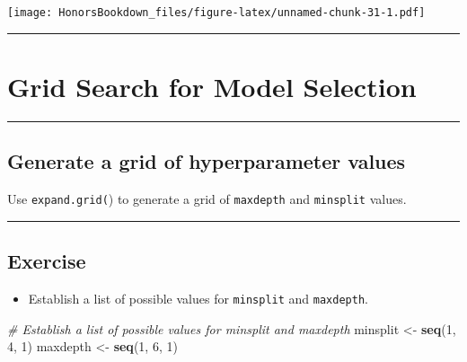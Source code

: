 \documentclass[
]{book}
\newenvironment{Shaded}{\begin{snugshade}}{\end{snugshade}}
\newcommand{\CommentTok}[1]{\textcolor[rgb]{0.56,0.35,0.01}{\textit{#1}}}
\newcommand{\DecValTok}[1]{\textcolor[rgb]{0.00,0.00,0.81}{#1}}
\newcommand{\KeywordTok}[1]{\textcolor[rgb]{0.13,0.29,0.53}{\textbf{#1}}}
\newcommand{\NormalTok}[1]{#1}
\newcommand{\StringTok}[1]{\textcolor[rgb]{0.31,0.60,0.02}{#1}}
\providecommand{\tightlist}{%
  \setlength{\itemsep}{0pt}\setlength{\parskip}{0pt}}
\begin{document}
\texttt{[image: HonorsBookdown\_files/figure-latex/unnamed-chunk-31-1.pdf]}

\begin{center}\rule{0.5\linewidth}{0.5pt}\end{center}

\hypertarget{grid-search-for-model-selection}{%
\section{Grid Search for Model Selection}\label{grid-search-for-model-selection}}

\begin{center}\rule{0.5\linewidth}{0.5pt}\end{center}

\hypertarget{generate-a-grid-of-hyperparameter-values}{%
\subsection{Generate a grid of hyperparameter values}\label{generate-a-grid-of-hyperparameter-values}}

Use \texttt{expand.grid(}) to generate a grid of \texttt{maxdepth} and \texttt{minsplit} values.

\begin{center}\rule{0.5\linewidth}{0.5pt}\end{center}

\hypertarget{exercise-8}{%
\subsection*{Exercise}\label{exercise-8}}

\begin{itemize}
\tightlist
\item
  Establish a list of possible values for \texttt{minsplit} and \texttt{maxdepth}.
\end{itemize}

\begin{Shaded}
\begin{Highlighting}[]
\CommentTok{# Establish a list of possible values for minsplit and maxdepth}
\NormalTok{minsplit <-}\StringTok{ }\KeywordTok{seq}\NormalTok{(}\DecValTok{1}\NormalTok{, }\DecValTok{4}\NormalTok{, }\DecValTok{1}\NormalTok{)}
\NormalTok{maxdepth <-}\StringTok{ }\KeywordTok{seq}\NormalTok{(}\DecValTok{1}\NormalTok{, }\DecValTok{6}\NormalTok{, }\DecValTok{1}\NormalTok{)}
\end{Highlighting}
\end{Shaded}
\end{document}
